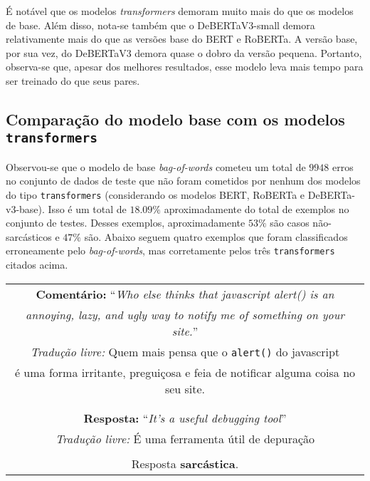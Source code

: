 É notável que os modelos \textit{transformers} demoram muito mais do que os
modelos de base. Além disso, nota-se também que o DeBERTaV3-small demora
relativamente mais do que as versões base do BERT e RoBERTa. A versão base, por
sua vez, do DeBERTaV3 demora quase o dobro da versão pequena. Portanto,
observa-se que, apesar dos melhores resultados, esse modelo leva mais tempo para
ser treinado do que seus pares.

\subsection{Comparação do modelo base com os modelos \texttt{transformers}}%
\label{sub:comparacao_do_modelo_base_com_os_modelos_transformers}

Observou-se que o modelo de base \textit{bag-of-words} cometeu um total de
$9948$ erros no conjunto de dados de teste que não foram cometidos por nenhum
dos modelos do tipo \texttt{transformers} (considerando os modelos
BERT, RoBERTa e DeBERTa-v3-base). Isso é um total de
$18.09\%$ aproximadamente do total de exemplos no conjunto de testes. Desses
exemplos, aproximadamente $53\%$ são casos não-sarcásticos e $47\%$ são. Abaixo
seguem quatro exemplos que foram classificados erroneamente pelo
\textit{bag-of-words}, mas corretamente pelos três \texttt{transformers} citados
acima. \jump

\begin{center}
\begin{tabular}{|c|}

\hline

\textbf{Comentário:} ``\textit{Who else thinks that javascript alert() is an} \\
\textit{annoying, lazy, and ugly way to notify me of something on your site.}''
\\

\textit{Tradução livre:} Quem mais pensa que o \texttt{alert()} do javascript \\
é uma forma irritante, preguiçosa e feia de notificar alguma coisa no seu
site. \\\\

\hline

\\

\textbf{Resposta:} ``\textit{It's a useful debugging tool}'' \\

\textit{Tradução livre:} É uma ferramenta útil de depuração \\ \\


Resposta \textbf{sarcástica}.

\\ \hline

\end{tabular}
\end{center}

